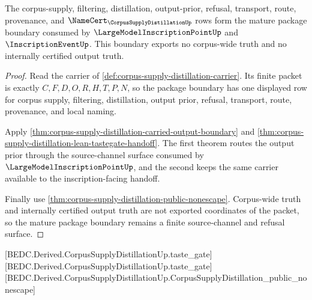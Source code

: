 \begin{theorem}
\label{thm:corpus-supply-distillation-mature-package-boundary}
The corpus-supply, filtering, distillation, output-prior, refusal, transport, route, provenance, and $\NameCert_{\CorpusSupplyDistillationUp}$ rows form the mature package boundary consumed by $\LargeModelInscriptionPointUp$ and $\InscriptionEventUp$. This boundary exports no corpus-wide truth and no internally certified output truth.
\end{theorem}
\begin{proof}
Read the carrier of \autoref{def:corpus-supply-distillation-carrier}. Its finite packet is exactly $C,F,D,O,R,H,T,P,N$, so the package boundary has one displayed row for corpus supply, filtering, distillation, output prior, refusal, transport, route, provenance, and local naming.

Apply \autoref{thm:corpus-supply-distillation-carried-output-boundary} and \autoref{thm:corpus-supply-distillation-lean-tastegate-handoff}. The first theorem routes the output prior through the source-channel surface consumed by $\LargeModelInscriptionPointUp$, and the second keeps the same carrier available to the inscription-facing handoff.

Finally use \autoref{thm:corpus-supply-distillation-public-nonescape}. Corpus-wide truth and internally certified output truth are not exported coordinates of the packet, so the mature package boundary remains a finite source-channel and refusal surface.
\end{proof}

[BEDC.Derived.CorpusSupplyDistillationUp.taste\_gate]
[BEDC.Derived.CorpusSupplyDistillationUp.taste\_gate]
[BEDC.Derived.CorpusSupplyDistillationUp.CorpusSupplyDistillation\_public\_nonescape]

